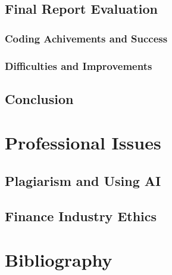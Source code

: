 \documentclass{article}
\begin{document}
\subsection{Final Report Evaluation}

\subsubsection{Coding Achivements and Success}

\subsubsection{Difficulties and Improvements}


\subsection{Conclusion}


\section{Professional Issues}

\subsection{Plagiarism and Using AI}

\subsection{Finance Industry Ethics}




\newpage
\section{Bibliography}
\end{document}
